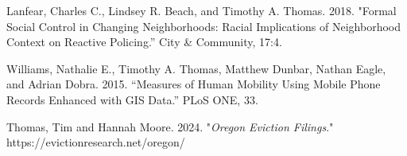 \begin{cvparagraph}

Lanfear, Charles C., Lindsey R. Beach, and Timothy A. Thomas. 2018. "Formal Social Control in Changing Neighborhoods: Racial Implications of Neighborhood Context on Reactive Policing.” City \& Community, 17:4.
\end{cvparagraph}

\begin{cvparagraph}

Williams, Nathalie E., Timothy A. Thomas, Matthew Dunbar, Nathan Eagle, and Adrian Dobra. 2015. “Measures of Human Mobility Using Mobile Phone Records Enhanced
with GIS Data.” PLoS ONE, 33.
\end{cvparagraph}







\begin{cvparagraph}

Thomas, Tim and Hannah Moore. 2024. "\emph{Oregon Eviction Filings}." https://evictionresearch.net/oregon/
\end{cvparagraph}

